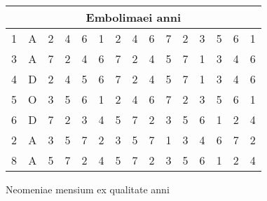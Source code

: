 {\begin{tabular}{@{} c c *{13}{c} @{}}
\midrule
\multicolumn{15}{c}{Embolimaei anni}\\
\midrule
 1 & A & 2 & 4 & 6 & 1 & 2 & 4 & 6 & 7 & 2 & 3 & 5 & 6 & 1 \\
 3 & A & 7 & 2 & 4 & 6 & 7 & 2 & 4 & 5 & 7 & 1 & 3 & 4 & 6 \\
 4 & D & 2 & 4 & 5 & 6 & 7 & 2 & 4 & 5 & 7 & 1 & 3 & 4 & 6 \\
 5 & O & 3 & 5 & 6 & 1 & 2 & 4 & 6 & 7 & 2 & 3 & 5 & 6 & 1 \\
 6 & D & 7 & 2 & 3 & 4 & 5 & 7 & 2 & 3 & 5 & 6 & 1 & 2 & 4 \\
 2 & A & 3 & 5 & 7 & 2 & 3 & 5 & 7 & 1 & 3 & 4 & 6 & 7 & 2 \\
 8 & A & 5 & 7 & 2 & 4 & 5 & 7 & 2 & 3 & 5 & 6 & 1 & 2 & 4 \\
\bottomrule
\end{tabular}
%
\caption{Neomeniae mensium ex qualitate anni}
\label{tab:p133}
%
}
